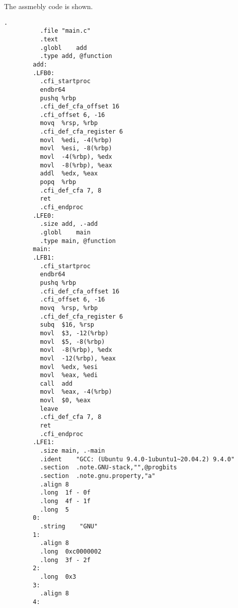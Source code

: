     \begin{example}
      The assmebly code is shown. 
      \begin{lstlisting}[language={[x86masm]Assembler}]
        .
          .file	"main.c"
          .text
          .globl	add
          .type	add, @function
        add:
        .LFB0:
          .cfi_startproc
          endbr64
          pushq	%rbp
          .cfi_def_cfa_offset 16
          .cfi_offset 6, -16
          movq	%rsp, %rbp
          .cfi_def_cfa_register 6
          movl	%edi, -4(%rbp)
          movl	%esi, -8(%rbp)
          movl	-4(%rbp), %edx
          movl	-8(%rbp), %eax
          addl	%edx, %eax
          popq	%rbp
          .cfi_def_cfa 7, 8
          ret
          .cfi_endproc
        .LFE0:
          .size	add, .-add
          .globl	main
          .type	main, @function
        main:
        .LFB1:
          .cfi_startproc
          endbr64
          pushq	%rbp
          .cfi_def_cfa_offset 16
          .cfi_offset 6, -16
          movq	%rsp, %rbp
          .cfi_def_cfa_register 6
          subq	$16, %rsp
          movl	$3, -12(%rbp)
          movl	$5, -8(%rbp)
          movl	-8(%rbp), %edx
          movl	-12(%rbp), %eax
          movl	%edx, %esi
          movl	%eax, %edi
          call	add
          movl	%eax, -4(%rbp)
          movl	$0, %eax
          leave
          .cfi_def_cfa 7, 8
          ret
          .cfi_endproc
        .LFE1:
          .size	main, .-main
          .ident	"GCC: (Ubuntu 9.4.0-1ubuntu1~20.04.2) 9.4.0"
          .section	.note.GNU-stack,"",@progbits
          .section	.note.gnu.property,"a"
          .align 8
          .long	 1f - 0f
          .long	 4f - 1f
          .long	 5
        0:
          .string	 "GNU"
        1:
          .align 8
          .long	 0xc0000002
          .long	 3f - 2f
        2:
          .long	 0x3
        3:
          .align 8
        4:
      \end{lstlisting}
    \end{example}

